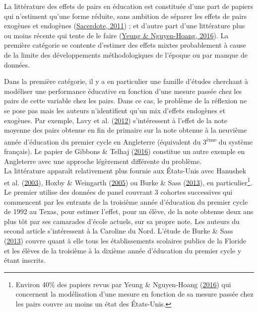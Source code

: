 \documentclass[
]{book}
\begin{document}
\quad La littérature des effets de pairs en éducation est constituée d'une part de papiers qui n'estiment qu'une forme réduite, sans ambition de séparer les effets de pairs exogènes et endogènes (\protect\hyperlink{ref-SAC:11}{Sacerdote, 2011}) ; et d'autre part d'une littérature plus ou moins récente qui tente de le faire (\protect\hyperlink{ref-YEU:NGU:16}{Yeung \& Nguyen-Hoang, 2016}). La première catégorie se contente d'estimer des effets mixtes probablement à cause de la limite des développements méthodologiques de l'époque ou par manque de données.

Dans la première catégorie, il y a en particulier une famille d'études cherchant à modéliser une performance éducative en fonction d'une mesure passée chez les pairs de cette variable chez les pairs. Dans ce cas, le problème de la réflexion ne se pose pas mais les auteurs n'identifient qu'un mix d'effets endogènes et exogènes. Par exemple, Lavy et al. (\protect\hyperlink{ref-LAV:eal:12}{2012}) s'intéressent à l'effet de la note moyenne des pairs obtenue en fin de primaire sur la note obtenue à la neuvième année d'éducation du premier cycle en Angleterre (équivalent du 3\textsuperscript{ème} du système français). Le papier de Gibbons \& Telhaj (\protect\hyperlink{ref-GIB:TEL:16}{2016}) constitue un autre exemple en Angleterre avec une approche légèrement différente du problème.\\
La littérature apparaît relativement plus fournie aux États-Unis avec Hanushek et al. (\protect\hyperlink{ref-HAN:eal:03}{2003}), Hoxby \& Weingarth (\protect\hyperlink{ref-HOX:WEI:05}{2005}) ou Burke \& Sass (\protect\hyperlink{ref-BUR:SAS:13}{2013}), en particulier\footnote{Environ 40\% des papiers revus par Yeung \& Nguyen-Hoang (\protect\hyperlink{ref-YEU:NGU:16}{2016}) qui concernent la modélisation d'une mesure en fonction de sa mesure passée chez les pairs couvre au moins un état des États-Unis.}. Le premier utilise des données de panel couvrant 3 cohortes successives qui commencent par les entrants de la troisième année d'éducation du premier cycle de 1992 au Texas, pour estimer l'effet, pour un élève, de la note obtenue deux ans plus tôt par ses camarades d'école actuels, sur sa propre note. Les auteurs du second article s'intéressent à la Caroline du Nord. L'étude de Burke \& Sass (\protect\hyperlink{ref-BUR:SAS:13}{2013}) couvre quant à elle tous les établissements scolaires publics de la Floride et les élèves de la troisième à la dixième année d'éducation du premier cycle y étant inscrits.
\end{document}
